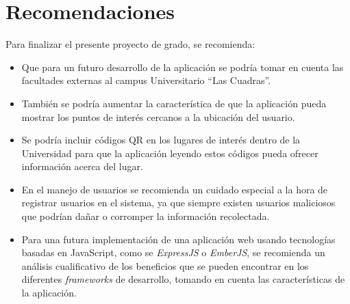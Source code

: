 \section{Recomendaciones}

Para finalizar el presente proyecto de grado, se recomienda:

\begin{itemize}
\item Que para un futuro desarrollo de la aplicación se podría tomar en cuenta las facultades externas al campus Universitario ``Las Cuadras''.

\item También se podría aumentar la característica de que la aplicación pueda mostrar los puntos de interés cercanos a la ubicación del usuario.

\item Se podría incluir códigos QR en los lugares de interés dentro de la Universidad para que la aplicación leyendo estos códigos pueda ofrecer información acerca del lugar.

\item En el manejo de usuarios se recomienda un cuidado especial a la hora de registrar usuarios en el sistema, ya que siempre existen usuarios maliciosos que podrían dañar o corromper la información recolectada.


\item Para una futura implementación de una aplicación web usando tecnologías basadas en JavaScript, como se \emph{ExpressJS} o \emph{EmberJS}, se recomienda un análisis cualificativo de los beneficios que se pueden encontrar en los diferentes \emph{frameworks} de desarrollo, tomando en cuenta las características de la aplicación.


\end{itemize}
